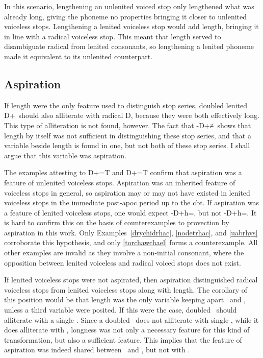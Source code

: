 In this scenario, lengthening an unlenited voiced stop only lengthened what was already long, giving the phoneme no properties bringing it closer to unlenited voiceless stops. Lengthening a lenited voiceless stop would add length, bringing it in line with a radical voiceless stop. This meant that length served to disambiguate radical from lenited consonants, so lengthening a lenited phoneme made it equivalent to its unlenited counterpart.

\subsection{Aspiration}
\label{sec:aspiration}
If length were the only feature used to distinguish stop series, doubled lenited \gls{D}+\lT\ should also alliterate with radical \gls{D}, because they were both effectively long. This type of alliteration is not found, however.  The fact that -\gls{D}+\lT≠\xD\ shows that length by itself was not sufficient in distinguishing these stop series, and that a variable beside length is found in one, but not both of these stop series. I shall argue that this variable was aspiration.

The examples attesting to \gls{D}+=\gls{T} and \gls{D}+=\gls{T} confirm that aspiration was a feature of unlenited voiceless stops. Aspiration was an inherited feature of voiceless stops in general, so aspiration may or may not have existed in lenited voiceless stops in the immediate post-\gls{apoc} period up to the \gls{cbt}. If aspiration was a feature of lenited voiceless stops, one would expect -\gls{D}+h=\lT, but not -\gls{D}+h=\xD. It is hard to confirm this on the basis of counterexamples to provection by aspiration in this work. Only Examples~\ref{drychidrhac}, \ref{nodetrhac}, and \ref{uabrhys} corroborate this hypothesis, and only \ref{torchawchael} forms a counterexample. All other examples are invalid as they involve a non-initial consonant, where the opposition between lenited voiceless and radical voiced stops does not exist. 

If lenited voiceless stops were not aspirated, then aspiration distinguished radical voiceless stops from lenited voiceless stops along with length. The corollary of this position would be that length was the only variable keeping apart \lT\ and \xD, unless a third variable were posited. If this were the case, doubled \lT\ should alliterate with a single \xD. Since a doubled \lT\ does not alliterate with single \xD, while it does alliterate with \xT, longness was not only a necessary feature for this kind of transformation, but also a  sufficient feature. This implies that the feature of aspiration was indeed shared between \lT\ and \xT, but not with \xD.

